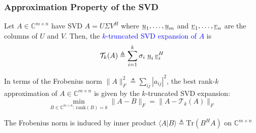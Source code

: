 \documentclass[10pt,english,aspectratio=169]{beamer}
\begin{document}
\begin{frame} \frametitle{Approximation Property of the SVD}

\begin{definition}
Let $A \in \mathbb{C}^{m\times n}$ have SVD $A=U \Sigma V^H$ where $\underline{u}_1,\ldots,\underline{u}_m$ and $\underline{v}_1,\ldots,\underline{v}_n$ are the columns of $U$ and $V$.
Then, the \textcolor{blue}{$k$-truncated SVD expansion of $A$} is \vspace{-2mm}
\[ \mathcal{T}_k (A) \triangleq \sum_{i=1}^k \sigma_i \; \underline{u}_i \, \underline{v}_i^H \]
\end{definition}

\vspace{2mm}

\begin{theorem}
In terms of the Frobenius norm $\| A \|_F^2 \triangleq \sum_{ij} |a_{ij}|^2$, the best rank-$k$ approximation of $A \in \mathbb{C}^{m\times n}$ is given by the $k$-truncated SVD expansion: \vspace{-2mm}
\[ \min_{B \in \mathbb{C}^{m\times n}: \, \text{rank}(B)=k} \| A - B \|_F  = \| A - \mathcal{T}_k (A) \|_F \]
\end{theorem}

\vspace{2mm}

The Frobenius norm is induced by inner product $\langle A | B \rangle \triangleq \text{Tr} (B^H A)$ on $\mathbb{C}^{m \times n}$  
\end{frame}
\end{document}
